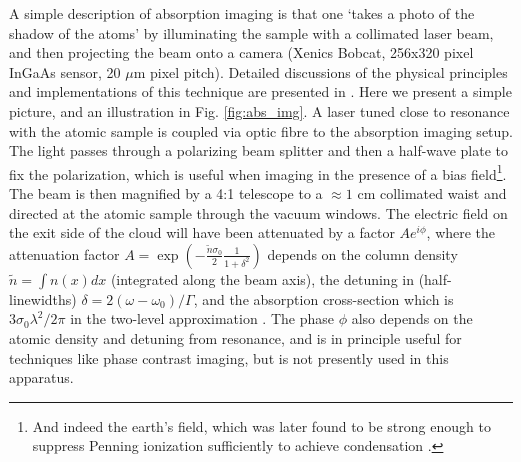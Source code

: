 	A simple description of absorption imaging is that one `takes a photo of the shadow of the atoms' by illuminating the sample with a collimated laser beam, and then projecting the beam onto a camera (Xenics Bobcat, 256x320 pixel InGaAs sensor, 20 $\mu$m pixel pitch).	
	Detailed discussions of the physical principles and implementations of this technique are presented in \cite{MakingProbingUnderstanding,TychkovThesis}.
	Here we present a simple picture, and an illustration in Fig. \ref{fig:abs_img}.
	A laser tuned close to resonance with the atomic sample is coupled via optic fibre to the absorption imaging setup.
	The light passes through a polarizing beam splitter and then a half-wave plate to fix the polarization, which is useful when imaging in the presence of a bias field\footnote{And indeed the earth's field, which was later found to be strong enough to suppress Penning ionization sufficiently to achieve condensation \cite{Abbas21}.}.
	The beam is then magnified by a 4:1 telescope to a $\approx1$ cm collimated waist and directed at the atomic sample through the vacuum windows.
	The electric field on the exit side of the cloud will have been attenuated by a factor $Ae^{i\phi}$, where the attenuation factor $A=\exp(-\frac{\tilde{n}\sigma_0}{2}\frac{1}{1+\delta^2})$ depends on the column density  $\tilde{n} = \int n(x) dx$ (integrated along the beam axis), the detuning in (half-linewidths) $\delta=2(\omega-\omega_0)/\Gamma$, and the absorption cross-section which is $3\sigma_0\lambda^2/2\pi$ in the two-level approximation \cite{MakingProbingUnderstanding}.
	The phase $\phi$ also depends on the atomic density and detuning from resonance, and is in principle useful for techniques like phase contrast imaging, but is not presently used in this apparatus.

